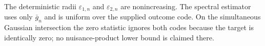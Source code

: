 The deterministic radii \(\varepsilon_{1,n}\) and \(\varepsilon_{2,n}\) are nonincreasing. The spectral estimator uses only \(\bar g_n\) and is uniform over the supplied outcome code. On the simultaneous Gaussian intersection the zero statistic ignores both codes because the target is identically zero; no nuisance-product lower bound is claimed there.